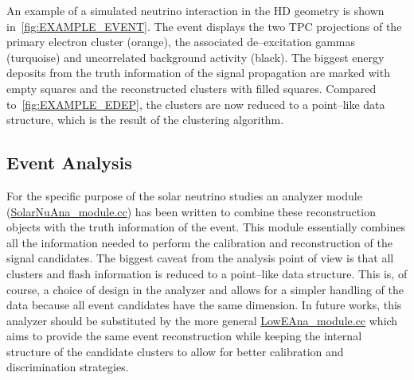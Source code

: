 An example of a simulated neutrino interaction in the \ac{HD} geometry is shown in~\cref{fig:EXAMPLE_EVENT}. The event displays the two \ac{TPC} projections of the primary electron cluster (orange), the associated de--excitation gammas (turquoise) and uncorrelated background activity (black). The biggest energy deposits from the truth information of the signal propagation are marked with empty squares and the reconstructed clusters with filled squares. Compared to~\cref{fig:EXAMPLE_EDEP}, the clusters are now reduced to a point--like data structure, which is the result of the clustering algorithm.

\subsection{Event Analysis}\label{sec:MC_ANALYSER}
For the specific purpose of the solar neutrino studies an analyzer module (\href{https://github.com/DUNE/duneana/blob/develop/duneana/SolarNuAna/SolarNuAna_module.cc}{SolarNuAna\_module.cc}) has been written to combine these reconstruction objects with the truth information of the event. This module essentially combines all the information needed to perform the calibration and reconstruction of the signal candidates. The biggest caveat from the analysis point of view is that all clusters and flash information is reduced to a point--like data structure. This is, of course, a choice of design in the analyzer and allows for a simpler handling of the data because all event candidates have the same dimension. In future works, this analyzer should be substituted by the more general \href{https://github.com/DUNE/duneana/blob/develop/duneana/LowEAna/LowEAna_module.cc}{LowEAna\_module.cc} which aims to provide the same event reconstruction while keeping the internal structure of the candidate clusters to allow for better calibration and discrimination strategies.